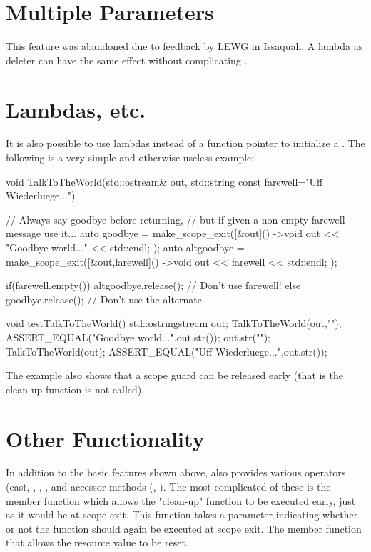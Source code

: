 \documentclass[ebook,11pt,article]{memoir}
\begin{document}
\section{Multiple Parameters}
This feature was abandoned due to feedback by LEWG in Issaquah. A lambda as deleter can have the same effect without complicating .

\section{Lambdas, etc.}
It is also possible to use lambdas instead of a function pointer to initialize a .  The following is a very simple and otherwise useless example:

\begin{codeblock}
void TalkToTheWorld(std::ostream& out, std::string const farewell="Uff Wiederluege...")
{
	// Always say goodbye before returning,
	// but if given a non-empty farewell message use it...
	auto goodbye = make_scope_exit([&out]() ->void
	{
		out << "Goodbye world..." << std::endl;
	});
	auto altgoodbye = make_scope_exit([&out,farewell]() ->void
	{
		out << farewell << std::endl;
	});


	if(farewell.empty())
	{
		altgoodbye.release();		// Don't use farewell!
	}
	else
	{
		goodbye.release();	// Don't use the alternate
	}
}
\end{codeblock}
\begin{codeblock}

void testTalkToTheWorld(){
	std::ostringstream out;
	TalkToTheWorld(out,"");
	ASSERT_EQUAL("Goodbye world...\n",out.str());
	out.str("");
	TalkToTheWorld(out);
	ASSERT_EQUAL("Uff Wiederluege...\n",out.str());
}
\end{codeblock}
The example also shows that a scope guard can be released early (that is the clean-up function is not called).

\section{Other Functionality}
In addition to the basic features shown above,  also provides various operators (cast, \tcode{->}, \tcode{()}, \tcode{*}, and accessor methods (, ).  The most complicated of these is the  member function which allows the "clean-up" function to be executed early, just as it would be at scope exit.  This function takes a parameter indicating whether or not the function should again be executed at scope exit.  The  member function that allows the resource value to be reset.
\end{document}

